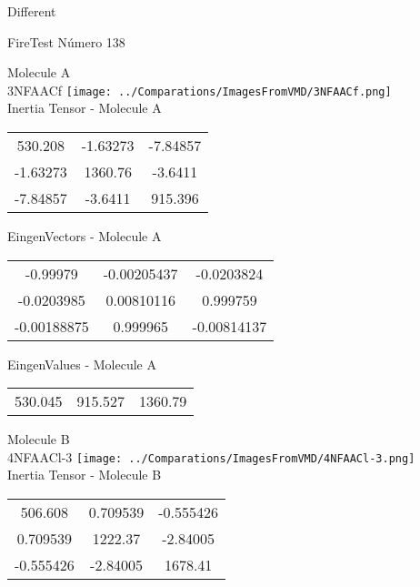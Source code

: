 \begin{center}
\vtab
\vtab
\textcolor{NavyBlue}{\Large Different}
\end{center}

 \newpage

\vtab[-2cm]
\begin{center}
{\large FireTest \tab Número 138}
\end{center}
\begin{multicols}{2}
\begin{center}

Molecule A \\ 
3NFAACf
\texttt{[image: ../Comparations/ImagesFromVMD/3NFAACf.png]}
\\
Inertia Tensor - Molecule A \\
\vtab

\begin{tabular}{|c c c|}
530.208	 & 	-1.63273	 & 	-7.84857	 \\
-1.63273	 & 	1360.76	 & 	-3.6411	 \\
-7.84857	 & 	-3.6411	 & 	915.396
\end{tabular}

\vtab
 EingenVectors - Molecule A     \\
\vtab
\begin{tabular}{|c c c|}
-0.99979	 & 	-0.00205437	 & 	-0.0203824	 \\
-0.0203985	 & 	0.00810116	 & 	0.999759	 \\
-0.00188875	 & 	0.999965	 & 	-0.00814137
\end{tabular}

\vtab
 EingenValues - Molecule A     \\
\vtab
\begin{tabular}{|c c c|}
530.045	 & 	915.527	 & 	1360.79	 \\
\end{tabular}
\columnbreak

Molecule B \\ 
4NFAACl-3
\texttt{[image: ../Comparations/ImagesFromVMD/4NFAACl-3.png]}
\\
Inertia Tensor - Molecule B \\
\vtab

\begin{tabular}{|c c c|}
506.608	 & 	0.709539	 & 	-0.555426	 \\
0.709539	 & 	1222.37	 & 	-2.84005	 \\
-0.555426	 & 	-2.84005	 & 	1678.41
\end{tabular}


\end{center}
\end{multicols}
